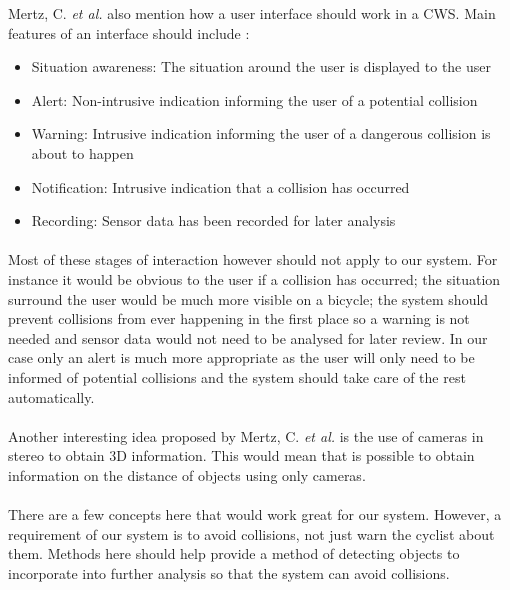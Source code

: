 \documentclass[a4paper]{report}
\begin{document}
Mertz, C. \textit{et al.} \cite{CWS_transit_buses} also mention how a user interface should work in a CWS. Main features of an interface should include :

\begin{itemize}
\item Situation awareness: The situation around the user is displayed to the user
\item Alert: Non-intrusive indication informing the user of a potential collision
\item Warning: Intrusive indication informing the user of a dangerous collision is about to happen
\item Notification: Intrusive indication that a collision has occurred
\item Recording: Sensor data has been recorded for later analysis
\end{itemize}

\paragraph{}Most of these stages of interaction however should not apply to our system. For instance it would be obvious to the user if a collision has occurred; the situation surround the user would be much more visible on a bicycle; the system should prevent collisions from ever happening in the first place so a warning is not needed and sensor data would not need to be analysed for later review. In our case only an alert is much more appropriate as the user will only need to be informed of potential collisions and the system should take care of the rest automatically.

\paragraph{}Another interesting idea proposed by Mertz, C. \textit{et al.} \cite{CWS_transit_buses} is the use of cameras in stereo to obtain 3D information. This would mean that is possible to obtain information on the distance of objects using only cameras.

\paragraph{}There are a few concepts here that would work great for our system. However, a requirement of our system is to avoid collisions, not just warn the cyclist about them. Methods here should help provide a method of detecting objects to incorporate into further analysis so that the system can avoid collisions. 
\end{document}
